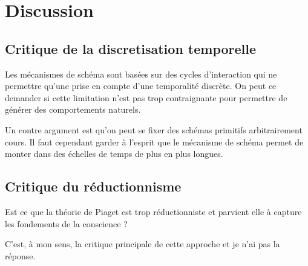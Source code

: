 \chapter{Discussion}



\section{Critique de la discretisation temporelle}

Les mécanismes de schéma sont basées sur des cycles d'interaction qui ne permettre qu'une prise en compte d'une temporalité discrète. 
On peut ce demander si cette limitation n'est pas trop contraignante pour permettre de générer des comportements naturels. 

Un contre argument est qu'on peut se fixer des schémas primitifs arbitrairement cours. 
Il faut cependant garder à l'esprit que le mécanisme de schéma permet de monter dans des échelles de temps de plus en plus longues. 




\section{Critique du réductionnisme}

Est ce que la théorie de Piaget est trop réductionniste et parvient elle à capture les fondements de la conscience ? 

C'est, à mon sens, la critique principale de cette approche et je n'ai pas la réponse. 